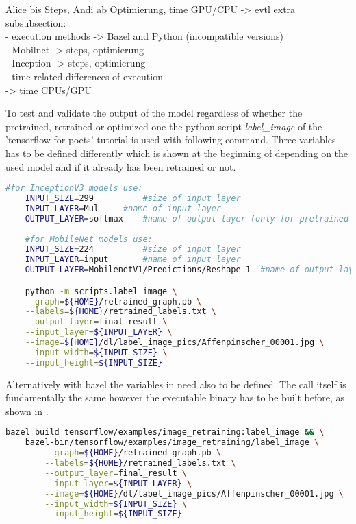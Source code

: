 	 Alice bis Steps, Andi ab Optimierung, time GPU/CPU
	-> evtl extra subsubsection: \\
		- execution methods -> Bazel and Python (incompatible versions) \\
		- Mobilnet -> steps, optimierung \\
		- Inception -> steps, optimierung \\
		- time related differences of execution  \\
		  -> time CPUs/GPU

To test and validate the output of the model regardless of whether the pretrained, retrained or optimized one the python script \textit{label\_image} of the 'tensorflow-for-poets'-tutorial is used with following command. Three variables has to be defined differently which is shown at the beginning of  depending on the used model and if it already has been retrained or not.
\begin{lstlisting}[caption=Call of \textit{label\_image.py}, label=list:label_image, language=bash]
	#for InceptionV3 models	use:
	INPUT_SIZE=299			#size of input layer
	INPUT_LAYER=Mul		#name of input layer
	OUTPUT_LAYER=softmax	#name of output layer (only for pretrained model otherwise 'final_result' or as defined in retrain-script)
	
	#for MobileNet models use:
	INPUT_SIZE=224			#size of input layer
	INPUT_LAYER=input	 	#name of input layer
	OUTPUT_LAYER=MobilenetV1/Predictions/Reshape_1	#name of output layer (only for pretrained model otherwise 'final_result' or as defined in retrain-script)

	python -m scripts.label_image \
	--graph=${HOME}/retrained_graph.pb \
	--labels=${HOME}/retrained_labels.txt \
	--output_layer=final_result \
	--input_layer=${INPUT_LAYER} \
	--image=${HOME}/dl/label_image_pics/Affenpinscher_00001.jpg \
	--input_width=${INPUT_SIZE} \
	--input_height=${INPUT_SIZE}
\end{lstlisting}

Alternatively with bazel the variables in  need also to be defined. The call itself is fundamentally the same however the executable binary has to be built before, as shown in .

\begin{lstlisting}[caption=Build and call of \textit{label\_image}, label=list:blabel_image, language=bash]
	bazel build tensorflow/examples/image_retraining:label_image && \
	bazel-bin/tensorflow/examples/image_retraining/label_image \
		--graph=${HOME}/retrained_graph.pb \
		--labels=${HOME}/retrained_labels.txt \
		--output_layer=final_result \
		--input_layer=${INPUT_LAYER} \
		--image=${HOME}/dl/label_image_pics/Affenpinscher_00001.jpg \
		--input_width=${INPUT_SIZE} \
		--input_height=${INPUT_SIZE}
\end{lstlisting}

